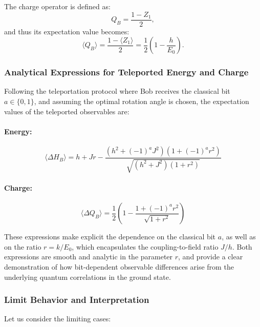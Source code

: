 The charge operator is defined as:
\begin{equation}
Q_B = \frac{1 - Z_1}{2},
\end{equation}
and thus its expectation value becomes:
\begin{equation}
\langle Q_B \rangle = \frac{1 - \langle Z_1 \rangle}{2} = \frac{1}{2} \left(1 - \frac{h}{E_0} \right).
\end{equation}

\subsubsection{Analytical Expressions for Teleported Energy and Charge}

Following the teleportation protocol where Bob receives the classical bit \( a \in \{0, 1\} \), and assuming the optimal rotation angle is chosen, the expectation values of the teleported observables are:

\paragraph{Energy:}
\begin{equation}
\langle \Delta H_B \rangle = h + Jr - \frac{ \left( h^2 + (-1)^a J^2 \right) \left( 1 + (-1)^a r^2 \right) }{ \sqrt{ (h^2 + J^2)(1 + r^2) } }
\end{equation}

\paragraph{Charge:}
\begin{equation}
\langle \Delta Q_B \rangle = \frac{1}{2} \left( 1 - \frac{ 1 + (-1)^a r^2 }{ \sqrt{1 + r^2} } \right)
\end{equation}

These expressions make explicit the dependence on the classical bit \( a \), as well as on the ratio \( r = k/E_0 \), which encapsulates the coupling-to-field ratio \( J/h \). Both expressions are smooth and analytic in the parameter \( r \), and provide a clear demonstration of how bit-dependent observable differences arise from the underlying quantum correlations in the ground state.

\subsubsection{Limit Behavior and Interpretation}

Let us consider the limiting cases:

